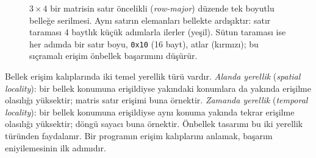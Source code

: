 \begin{figure}[htbp]
\centering
{}
\caption[Matrisin satır öncelikli bellek yerleşimi]{$3 \times 4$ bir matrisin satır öncelikli (\emph{row-major}) düzende tek boyutlu belleğe serilmesi. Aynı satırın elemanları bellekte ardışıktır: satır taraması 4 baytlık küçük adımlarla ilerler (yeşil). Sütun taraması ise her adımda bir satır boyu, \texttt{0x10} (16 bayt), atlar (kırmızı); bu sıçramalı erişim önbellek başarımını düşürür.}
\label{fig:matris-yerlesim}
\end{figure}

\begin{bilginot}
Bellek erişim kalıplarında iki temel yerellik türü vardır. \emph{Alanda yerellik} (\emph{spatial locality}): bir bellek konumuna erişildiyse yakındaki konumlara da yakında erişilme olasılığı yüksektir; matris satır erişimi buna örnektir. \emph{Zamanda yerellik} (\emph{temporal locality}): bir bellek konumuna erişildiyse aynı konuma yakında tekrar erişilme olasılığı yüksektir; döngü sayacı buna örnektir. Önbellek tasarımı bu iki yerellik türünden faydalanır. Bir programın erişim kalıplarını anlamak, başarım eniyilemesinin ilk adımıdır.
\end{bilginot}


